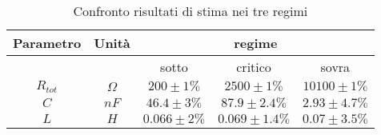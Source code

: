 \begin{table}[H]
\begin{center}
\begin{tabular}{|c|c|c|c|c|}

\hline
\multicolumn{ 1}{|c}{Parametro} & \multicolumn{ 1}{|c|}{Unità} & \multicolumn{ 3}{c|}{regime} \\ \hline

\multicolumn{ 1}{|c}{} & \multicolumn{ 1}{|c|}{} & sotto & critico & sovra \\ 

$R_{tot}$ & $\Omega$ & $200\pm1\%$ & $2500\pm1\%$ & $10100\pm1\%$ \\ 

$C$ & $nF$ & $46.4\pm3\%$ & $87.9\pm2.4\%$ & $2.93\pm4.7\%$ \\ 

$L$ & $H$ & $0.066\pm2\%$ & $0.069\pm1.4\%$ & $0.07\pm3.5\%$ \\ 

\hline
\end{tabular}
\end{center}
\caption{Confronto risultati di stima nei tre regimi}
\label{C4_P1_finale}
\end{table}

